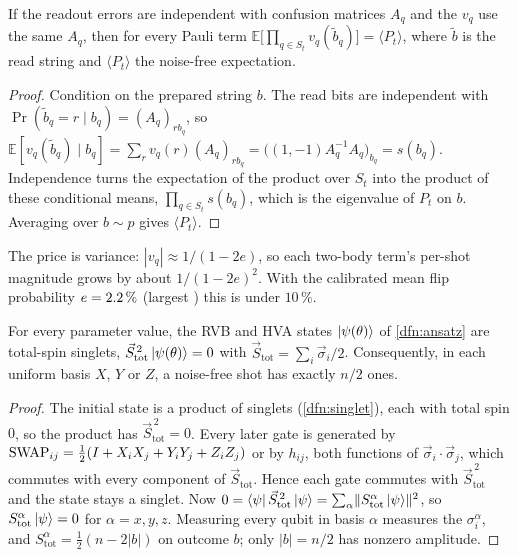 \begin{prop}\label{prop:readout}
  If the readout errors are independent with confusion matrices $A_q$ and the $v_q$ use the same
  $A_q$, then for every Pauli term $\mathbb E\bigl[\prod_{q\in S_t}v_q(\tilde b_q)\bigr]=\langle P_t\rangle$,
  where $\tilde b$ is the read string and $\langle P_t\rangle$ the noise-free expectation.
\end{prop}

\begin{proof}
  Condition on the prepared string $b$. The read bits are independent with
  $\Pr(\tilde b_q=r\mid b_q)=(A_q)_{r b_q}$, so
  $\mathbb E[v_q(\tilde b_q)\mid b_q]=\sum_r v_q(r)(A_q)_{r b_q}=\bigl((1,-1)A_q^{-1}A_q\bigr)_{b_q}=s(b_q)$.
  Independence turns the expectation of the product over $S_t$ into the product of these
  conditional means, $\prod_{q\in S_t}s(b_q)$, which is the eigenvalue of $P_t$ on $b$. Averaging
  over $b\sim p$ gives $\langle P_t\rangle$.
\end{proof}

The price is variance: $|v_q|\approx1/(1-2e)$, so each two-body term's per-shot magnitude grows
by about $1/(1-2e)^2$. With the calibrated mean flip probability $e=2.2\,\%$ (largest
\VMtReadoutErrMax) this is under $10\,\%$.

\begin{prop}\label{prop:sector}
  For every parameter value, the RVB and HVA states $\ket{\psi(\theta)}$ of \cref{dfn:ansatz}
  are total-spin singlets, $\vec S_{\mathrm{tot}}^{\,2}\ket{\psi(\theta)}=0$ with
  $\vec S_{\mathrm{tot}}=\sum_i\vec\sigma_i/2$. Consequently, in each uniform basis $X$, $Y$ or
  $Z$, a noise-free shot has exactly $n/2$ ones.
\end{prop}

\begin{proof}
  The initial state is a product of singlets (\cref{dfn:singlet}), each with total spin $0$, so
  the product has $\vec S_{\mathrm{tot}}^{\,2}=0$. Every later gate is generated by
  $\mathrm{SWAP}_{ij}=\tfrac12(I+X_iX_j+Y_iY_j+Z_iZ_j)$ or by $h_{ij}$, both functions of
  $\vec\sigma_i\cdot\vec\sigma_j$, which commutes with every component of $\vec S_{\mathrm{tot}}$.
  Hence each gate commutes with $\vec S_{\mathrm{tot}}^{\,2}$ and the state stays a singlet.
  Now $0=\bra\psi\vec S_{\mathrm{tot}}^{\,2}\ket\psi=\sum_{\alpha}\lVert S^\alpha_{\mathrm{tot}}\ket\psi\rVert^2$,
  so $S^\alpha_{\mathrm{tot}}\ket\psi=0$ for $\alpha=x,y,z$. Measuring every qubit in basis
  $\alpha$ measures the $\sigma^\alpha_i$, and $S^\alpha_{\mathrm{tot}}=\tfrac12(n-2|b|)$ on outcome
  $b$; only $|b|=n/2$ has nonzero amplitude.
\end{proof}

